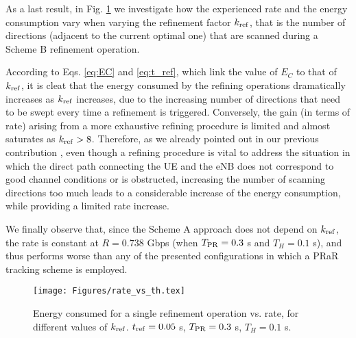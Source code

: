 \documentclass[conference]{IEEEtran}
\newlength\fheight
\newlength\fwidth
\newif\iftikz
\begin{document}
	
	
As a last result, in Fig. \ref{fig:EC_vs_k} we investigate how the experienced rate and the energy consumption vary when varying the refinement factor $k_{\rm ref}$, that is the number of directions (adjacent to the current optimal one) that are scanned during a Scheme B refinement operation. 

According to Eqs. \eqref{eq:EC} and \eqref{eq:t_ref}, which link the value of $E_C$ to that of $k_{\rm ref}$, it is cleat that the energy consumed by the refining operations dramatically increases as $k_{\rm ref}$ increases, due to the increasing number of directions that need to be swept every time a refinement is triggered. 
Conversely, the gain (in terms of rate) arising from a more exhaustive refining procedure is limited and almost saturates as $k_{\rm ref}>8$. 
Therefore, as we already pointed out in our previous contribution \cite{Giordani_magazineIA_2016}, even though a refining procedure is vital to address the situation in which the direct path connecting the UE and the eNB does not correspond to good channel conditions or is obstructed,  increasing the number of scanning directions too much leads to a  considerable
increase of the energy consumption, while providing a limited
rate increase.

We finally observe that, since the Scheme A approach does not depend on $k_{\rm ref}$, the rate is constant at $R = 0.738$ Gbps (when $T_{\rm PR}=0.3$ s and $T_H=0.1$ s), and thus performs worse than any of the presented configurations in which a PRaR tracking scheme is employed.

\begin{figure}[t!]
\centering
		\setlength{\belowcaptionskip}{0cm}
		\iftikz
		\setlength{\belowcaptionskip}{0cm}
		\setlength\fwidth{0.78\columnwidth}
		\setlength\fheight{0.45\columnwidth}
		
		\else
		\texttt{[image: Figures/rate\_vs\_th.tex]}
		\fi
		\caption{Energy consumed for a single refinement operation vs. rate, for different values of $k_{\rm ref}$. $t_{\rm ref} = 0.05$ s, $T_{\rm PR}=0.3$ s, $T_H=0.1$ s. }
		\vspace{-1.2em}
			\label{fig:EC_vs_k}
	\end{figure}
\end{document}

